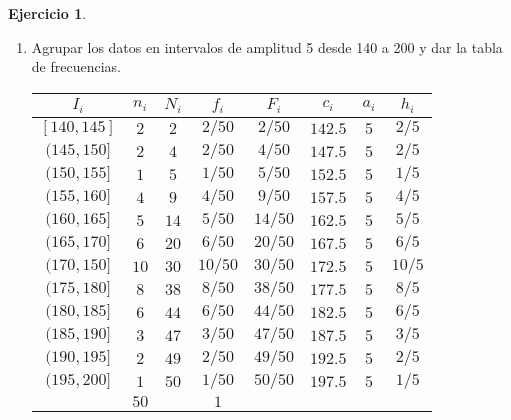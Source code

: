 \documentclass[a4paper, 12pt]{article}
\theoremstyle{definition}
\newtheorem{ej}{Ejercicio}
\begin{document}
\begin{ej}
\begin{enumerate}[label=\textit{\alph*)}]

\item Agrupar los datos en intervalos de amplitud 5 desde 140 a 200 y dar la tabla de frecuencias.

\begin{center}
    
\begin{tabular}{|c|c|c|c|c|c|c|c|}
    \hline
    \(I_i\) & \(n_i\) & \(N_i\) & \(f_i\) & \(F_i\) & \(c_i\) & \(a_i\) & \(h_i\) \\ 
    \hline
    \([140,145]\) & \(2\) & \(2\) & \(2/50\) & \(2/50\) & \(142.5\) & \(5\) & \(2/5\) \\
    \((145,150]\) & \(2\) & \(4\) & \(2/50\) & \(4/50\) & \(147.5\) & \(5\) & \(2/5\) \\
    \((150, 155]\) & \(1\) & \(5\) & \(1/50\) & \(5/50\) & \(152.5\) & \(5\) & \(1/5\) \\
    \((155,160]\) & \(4\) & \(9\) & \(4/50\) & \(9/50\) & \(157.5\) & \(5\) & \(4/5\) \\
    \((160,165]\) & \(5\) & \(14\) & \(5/50\) & \(14/50\) & \(162.5\) & \(5\) & \(5/5\) \\
    \((165,170]\) & \(6\) & \(20\) & \(6/50\) & \(20/50\) & \(167.5\) & \(5\) & \(6/5\) \\
    \((170,150]\) & \(10\) & \(30\) & \(10/50\) & \(30/50\) & \(172.5\) & \(5\) & \(10/5\) \\
    \((175,180]\) & \(8\) & \(38\) & \(8/50\) & \(38/50\) & \(177.5\) & \(5\) & \(8/5\) \\
    \((180,185]\) & \(6\) & \(44\) & \(6/50\) & \(44/50\) & \(182.5\) & \(5\) & \(6/5\) \\
    \((185,190]\) & \(3\) & \(47\) & \(3/50\) & \(47/50\) & \(187.5\) & \(5\) & \(3/5\) \\
    \((190,195]\) & \(2\) & \(49\) & \(2/50\) & \(49/50\) & \(192.5\) & \(5\) & \(2/5\) \\
    \((195,200]\) & \(1\) & \(50\) & \(1/50\) & \(50/50\) & \(197.5\) & \(5\) & \(1/5\) \\
    \hline
    & \(50\) & & \(1\) & & & & \\
    \hline
\end{tabular}

\end{center}



\end{enumerate}
\end{ej}
\end{document}
